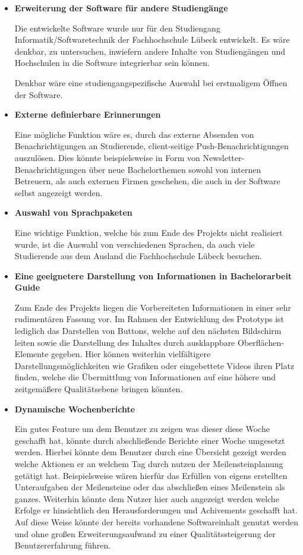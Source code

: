 \documentclass[bibliography=totoc,listof=totoc,BCOR=5mm,DIV=12,oneside]{scrbook}
\begin{document}
\begin{itemize}
\item \textbf{Erweiterung der Software für andere Studiengänge}
\par Die entwickelte Software wurde nur für den Studiengang Informatik/Softwaretechnik der Fachhochschule Lübeck entwickelt. Es wäre denkbar, zu untersuchen, inwiefern andere Inhalte von Studiengängen und Hochschulen in die Software integrierbar sein können.
\par Denkbar wäre eine studiengangspezifische Auswahl bei erstmaligem Öffnen der Software.
\item \textbf{Externe definierbare Erinnerungen}
\par Eine mögliche Funktion wäre es, durch das externe Absenden von Benachrichtigungen an Studierende, client-seitige Push-Benachrichtigungen auszulösen. Dies könnte beispielsweise in Form von Newsletter-Benachrichtigungen über neue Bachelorthemen sowohl von internen Betreuern, als auch externen Firmen geschehen, die auch in der Software selbst angezeigt werden.

\item \textbf{Auswahl von Sprachpaketen}
\par Eine wichtige Funktion, welche bis zum Ende des Projekts nicht realisiert wurde, ist die Auswahl von verschiedenen Sprachen, da auch viele Studierende aus dem Ausland die Fachhochschule Lübeck besuchen.

\item \textbf{Eine geeignetere Darstellung von Informationen in Bachelorarbeit Guide}
\par Zum Ende des Projekts liegen die Vorbereiteten Informationen in einer sehr rudimentären Fassung vor. Im Rahmen der Entwicklung des Prototyps ist lediglich das Darstellen von Buttons, welche auf den nächsten Bildschirm leiten sowie die Darstellung des Inhaltes durch ausklappbare Oberflächen-Elemente gegeben. Hier können weiterhin vielfältigere Darstellungsmöglichkeiten wie Grafiken oder eingebettete Videos ihren Platz finden, welche die Übermittlung von Informationen auf eine höhere und zeitgemäßere Qualitätsebene bringen könnten.

\item \textbf{Dynamische Wochenberichte}
\par Ein gutes Feature um dem Benutzer zu zeigen was dieser diese Woche geschafft hat, könnte durch abschließende Berichte einer Woche umgesetzt werden. Hierbei könnte dem Benutzer durch eine Übersicht gezeigt werden welche Aktionen er an welchem Tag durch nutzen der Meilensteinplanung getätigt hat. Beispielsweise wären hierfür das Erfüllen von eigens erstellten Unteraufgaben der Meilensteine oder das abschließen eines Meilenstein als ganzes. Weiterhin könnte dem Nutzer hier auch angezeigt werden welche Erfolge er hinsichtlich den Herausforderungen und Achivements geschafft hat. Auf diese Weise könnte der bereits vorhandene Softwareinhalt genutzt werden und ohne großen Erweiterungsaufwand zu einer Qualitätssteigerung der Benutzererfahrung führen.
\end{itemize}
\end{document}
